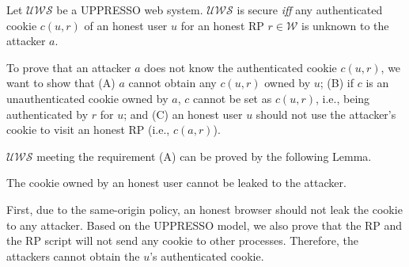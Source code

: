 \vspace{-\topsep}
\begin{definition}
Let $\mathcal{UWS}$ be a UPPRESSO web system. $\mathcal{UWS}$ is secure {\em iff} any authenticated cookie $c(u,r)$ of an honest user $u$ for an honest RP $r \in \mathcal{W}$ is unknown to the attacker $a$.
\label{def:secure}
\end{definition}
\vspace{-\topsep}
To prove that an attacker $a$ does not know the authenticated cookie $c(u,r)$, we want to show that (A) $a$ cannot obtain any $c(u,r)$ owned by $u$; (B) if $c$ is an unauthenticated cookie owned by $a$, $c$ cannot be set as $c(u,r)$, i.e., being authenticated by $r$ for $u$; and (C) an honest user $u$ should not use the attacker's cookie to visit an honest RP (i.e., $c(a,r)$).

$\mathcal{UWS}$ meeting the requirement (A) can be proved by the following Lemma.
\vspace{-\topsep}
\begin{lemma}
The cookie owned by an honest user cannot be leaked to the attacker.
\label{lemma:cookie}
\end{lemma}
\vspace{-\topsep}
First, due to the same-origin policy, an honest browser should not leak the cookie to any attacker. Based on the UPPRESSO model, we also prove that the RP and the RP script will not send any cookie to other processes. Therefore, the attackers cannot obtain the $u$'s authenticated  cookie.

